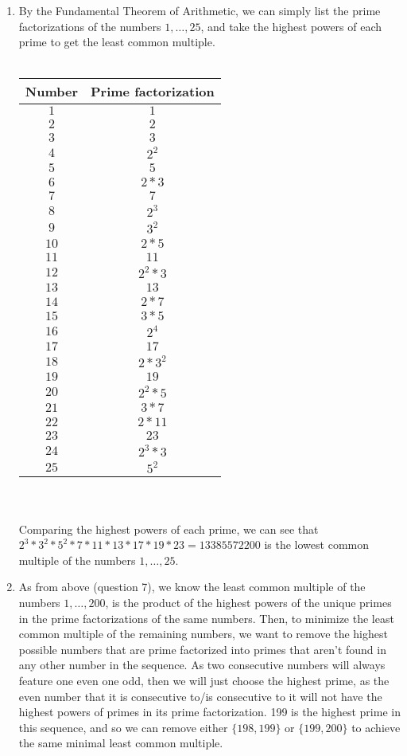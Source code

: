 \documentclass[10pt,english]{article}
\begin{document}
\begin{enumerate}
\pagebreak
\item By the Fundamental Theorem of Arithmetic, we can simply list the prime factorizations of the numbers $1,\ldots,25$, and take the highest powers of each prime to get the least common multiple. \\ \\ 
\begin{tabular}{|c|c|}
\hline
Number & Prime factorization \\ \hline
$1$ & $1$    \\
$2$ & $2$    \\      
$3$ & $3$    \\ 
$4$ & $2^2$   \\
$5$ & $5$ \\ 
$6$ & $2*3$ \\ 
$7$ & $7$ \\ 
$8$ & $2^3$ \\ 
$9$ & $3^2$ \\ 
$10$ & $2*5$ \\ 
$11$ & $11$ \\ 
$12$ & $2^2*3$ \\ 
$13$ & $13$ \\ 
$14$ & $2*7$ \\ 
$15$ & $3*5$ \\ 
$16$ & $2^4$ \\ 
$17$ & $17$ \\ 
$18$ & $2*3^2$ \\ 
$19$ & $19$ \\ 
$20$ & $2^2*5$ \\ 
$21$ & $3*7$ \\ 
$22$ & $2*11$ \\ 
$23$ & $23$ \\ 
$24$ & $2^3*3$ \\ 
$25$ & $5^2$ \\ 
\hline
\end{tabular}\\ \\
Comparing the highest powers of each prime, we can see that $2^3*3^2*5^2*7*11*13*17*19*23=13385572200$ is the lowest common multiple of the numbers $1,\ldots,25$.


\pagebreak
\item As from above (question 7), we know the least common multiple of the numbers $1,\ldots,200$, is the product of the highest powers of the unique primes in the prime factorizations of the same numbers. Then, to minimize the least common multiple of the remaining numbers, we want to remove the highest possible numbers that are prime factorized into primes that aren't found in any other number in the sequence. As two consecutive numbers will always feature one even one odd, then we will just choose the highest prime, as the even number that it is consecutive to/is consecutive to it will not have the highest powers of primes in its prime factorization. 199 is the highest prime in this sequence, and so we can remove either $\{198,199\}$ or $\{199,200\}$ to achieve the same minimal least common multiple. 



\end{enumerate}
\end{document}
